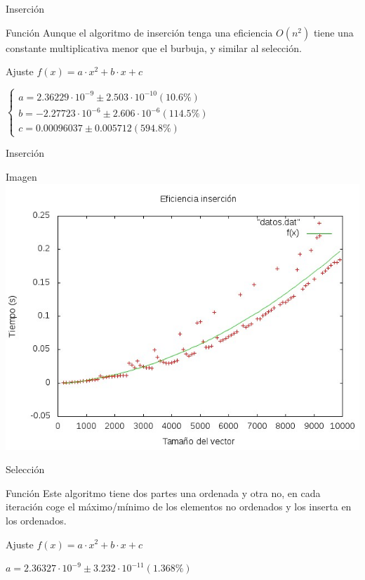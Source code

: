 \documentclass[compress]{beamer}
\begin{document}

\begin{frame}{Inserción}
	\begin{block}{Función}
	Aunque el algoritmo de inserción tenga una eficiencia $O(n^2)$ tiene una constante 			multiplicativa menor que el burbuja, y similar al selección.
	\end{block}
	
	\begin{block}{Ajuste}
	$f(x) = a\cdot x^2 + b\cdot x + c$
	
	$\left\{ \begin{array}{c}
	a               = 2.36229\cdot 10^{-9}      \pm 2.503\cdot 10^{-10}    (10.6\%) \\
	b               = -2.27723\cdot 10^{-6}     \pm 2.606\cdot 10^{-6}    (114.5\%) \\
	c               = 0.00096037       \pm 0.005712     (594.8\%)
	\end{array}\right.$	
	\end{block}
\end{frame}

\begin{frame}{Inserción}
	\begin{alertblock}{Imagen}
	\includegraphics[scale=0.55]{../Graficas/Insercion/insercionO0_ruben.jpeg}
	\end{alertblock}
\end{frame}



\begin{frame}{Selección}
	\begin{block}{Función}
		Este algoritmo tiene dos partes una ordenada y otra no, en cada iteración coge el 			máximo/mínimo de los elementos no ordenados y los inserta en los ordenados.
	\end{block}
	
	\begin{block}{Ajuste}
	$f(x) = a\cdot x^2 + b\cdot x + c$
	
	$ a               = 2.36327\cdot 10^{-9}      \pm 3.232\cdot 10^{-11}    (1.368\%) $
	\end{block}
\end{frame}
\end{document}
